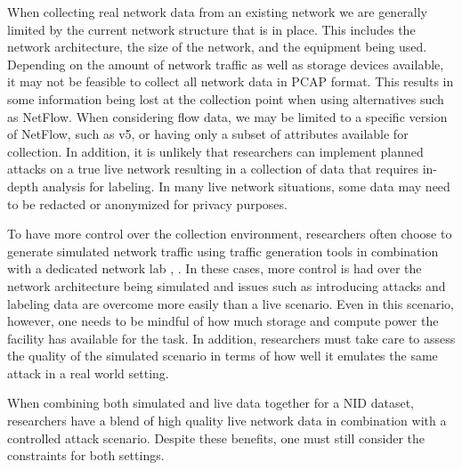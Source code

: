 \documentclass[sigconf]{acmart}
\begin{document}
When collecting real network data from an existing network we are generally limited by the current network structure that is in place.
This includes the network architecture, the size of the network, and the equipment being used.
Depending on the amount of network traffic as well as storage devices available, it may not be feasible to collect all network data in PCAP format.
This results in some information being lost at the collection point when using alternatives such as NetFlow.
When considering flow data, we may be limited to a specific version of NetFlow, such as v5, or having only a subset of attributes available for collection.
In addition, it is unlikely that researchers can implement planned attacks on a true live network resulting in a collection of data that requires in-depth analysis for labeling.
In many live network situations, some data may need to be redacted or anonymized for privacy purposes.

To have more control over the collection environment, researchers often choose to generate simulated network traffic using traffic generation tools in combination with a dedicated network lab \cite{unswnb15}, \cite{sharafaldin2018toward}.
In these cases, more control is had over the network architecture being simulated and issues such as introducing attacks and labeling data are overcome more easily than a live scenario.
Even in this scenario, however, one needs to be mindful of how much storage and compute power the facility has available for the task.
In addition, researchers must take care to assess the quality of the simulated scenario in terms of how well it emulates the same attack in a real world setting.

When combining both simulated and live data together for a NID dataset, researchers have a blend of high quality live network data in combination with a controlled attack scenario.
Despite these benefits, one must still consider the constraints for both settings.

\end{document}
